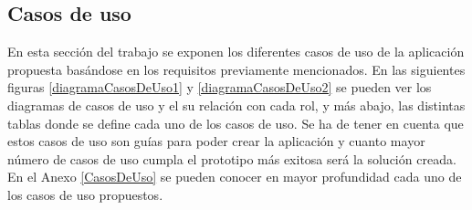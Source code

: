 

         
        \subsection{Casos de uso}
        En esta sección del trabajo se exponen los diferentes casos de uso de la aplicación propuesta basándose en los requisitos previamente mencionados. En las siguientes figuras \ref{diagramaCasosDeUso1} y \ref{diagramaCasosDeUso2} se pueden ver los diagramas de casos de uso y el su relación con cada rol, y más abajo, las distintas tablas donde se define cada uno de los casos de uso. Se ha de tener en cuenta que estos casos de uso son guías para poder crear la aplicación y cuanto mayor número de casos de uso cumpla el prototipo más exitosa será la solución creada. En el Anexo \ref{CasosDeUso} se pueden conocer en mayor profundidad cada uno de los casos de uso propuestos.

        


\vspace{10 cm}






\clearpage

